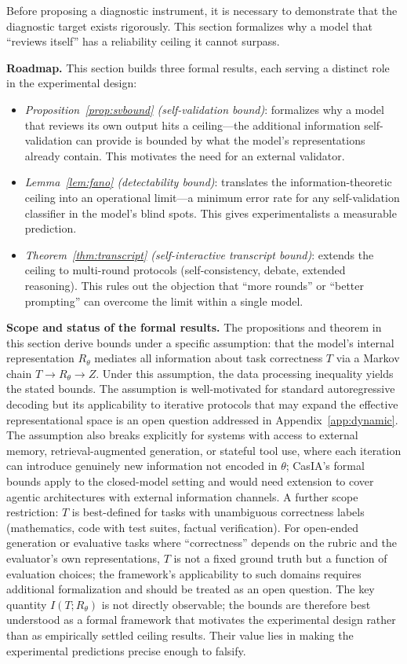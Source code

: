 \documentclass[11pt,a4paper]{article}
\theoremstyle{definition}
\newcommand{\Rtheta}{R_\theta}
\begin{document}
Before proposing a diagnostic instrument, it is necessary to demonstrate that the diagnostic target exists rigorously. This section formalizes why a model that ``reviews itself'' has a reliability ceiling it cannot surpass.

\textbf{Roadmap.} This section builds three formal results, each serving a distinct role in the experimental design:
\begin{itemize}[leftmargin=*,itemsep=2pt]
\item \emph{Proposition~\ref{prop:svbound} (self-validation bound)}: formalizes why a model that reviews its own output hits a ceiling---the additional information self-validation can provide is bounded by what the model's representations already contain. This motivates the need for an external validator.
\item \emph{Lemma~\ref{lem:fano} (detectability bound)}: translates the information-theoretic ceiling into an operational limit---a minimum error rate for any self-validation classifier in the model's blind spots. This gives experimentalists a measurable prediction.
\item \emph{Theorem~\ref{thm:transcript} (self-interactive transcript bound)}: extends the ceiling to multi-round protocols (self-consistency, debate, extended reasoning). This rules out the objection that ``more rounds'' or ``better prompting'' can overcome the limit within a single model.
\end{itemize}

\textbf{Scope and status of the formal results.} The propositions and theorem in this section derive bounds under a specific assumption: that the model's internal representation $\Rtheta$ mediates all information about task correctness $T$ via a Markov chain $T \to \Rtheta \to Z$. Under this assumption, the data processing inequality yields the stated bounds. The assumption is well-motivated for standard autoregressive decoding but its applicability to iterative protocols that may expand the effective representational space is an open question addressed in Appendix~\ref{app:dynamic}. The assumption also breaks explicitly for systems with access to external memory, retrieval-augmented generation, or stateful tool use, where each iteration can introduce genuinely new information not encoded in $\theta$; CasIA's formal bounds apply to the closed-model setting and would need extension to cover agentic architectures with external information channels. A further scope restriction: $T$ is best-defined for tasks with unambiguous correctness labels (mathematics, code with test suites, factual verification). For open-ended generation or evaluative tasks where ``correctness'' depends on the rubric and the evaluator's own representations, $T$ is not a fixed ground truth but a function of evaluation choices; the framework's applicability to such domains requires additional formalization and should be treated as an open question. The key quantity $I(T; \Rtheta)$ is not directly observable; the bounds are therefore best understood as a formal framework that motivates the experimental design rather than as empirically settled ceiling results. Their value lies in making the experimental predictions precise enough to falsify.
\end{document}
